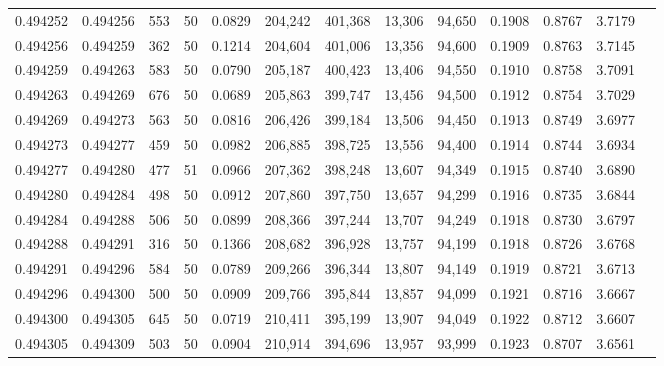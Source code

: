 \begin{tabular}{rrrrrrrrrrrrr}
0.494252 & 0.494256 &   553 &  50 &                                     0.0829 & 204,242 & 401,368 &  13,306 &  94,650 & 0.1908 & 0.8767 & 3.7179 \\
0.494256 & 0.494259 &   362 &  50 &                                     0.1214 & 204,604 & 401,006 &  13,356 &  94,600 & 0.1909 & 0.8763 & 3.7145 \\
0.494259 & 0.494263 &   583 &  50 &                                     0.0790 & 205,187 & 400,423 &  13,406 &  94,550 & 0.1910 & 0.8758 & 3.7091 \\
0.494263 & 0.494269 &   676 &  50 &                                     0.0689 & 205,863 & 399,747 &  13,456 &  94,500 & 0.1912 & 0.8754 & 3.7029 \\
0.494269 & 0.494273 &   563 &  50 &                                     0.0816 & 206,426 & 399,184 &  13,506 &  94,450 & 0.1913 & 0.8749 & 3.6977 \\
0.494273 & 0.494277 &   459 &  50 &                                     0.0982 & 206,885 & 398,725 &  13,556 &  94,400 & 0.1914 & 0.8744 & 3.6934 \\
0.494277 & 0.494280 &   477 &  51 &                                     0.0966 & 207,362 & 398,248 &  13,607 &  94,349 & 0.1915 & 0.8740 & 3.6890 \\
0.494280 & 0.494284 &   498 &  50 &                                     0.0912 & 207,860 & 397,750 &  13,657 &  94,299 & 0.1916 & 0.8735 & 3.6844 \\
0.494284 & 0.494288 &   506 &  50 &                                     0.0899 & 208,366 & 397,244 &  13,707 &  94,249 & 0.1918 & 0.8730 & 3.6797 \\
0.494288 & 0.494291 &   316 &  50 &                                     0.1366 & 208,682 & 396,928 &  13,757 &  94,199 & 0.1918 & 0.8726 & 3.6768 \\
0.494291 & 0.494296 &   584 &  50 &                                     0.0789 & 209,266 & 396,344 &  13,807 &  94,149 & 0.1919 & 0.8721 & 3.6713 \\
0.494296 & 0.494300 &   500 &  50 &                                     0.0909 & 209,766 & 395,844 &  13,857 &  94,099 & 0.1921 & 0.8716 & 3.6667 \\
0.494300 & 0.494305 &   645 &  50 &                                     0.0719 & 210,411 & 395,199 &  13,907 &  94,049 & 0.1922 & 0.8712 & 3.6607 \\
0.494305 & 0.494309 &   503 &  50 &                                     0.0904 & 210,914 & 394,696 &  13,957 &  93,999 & 0.1923 & 0.8707 & 3.6561 \\

\end{tabular}
